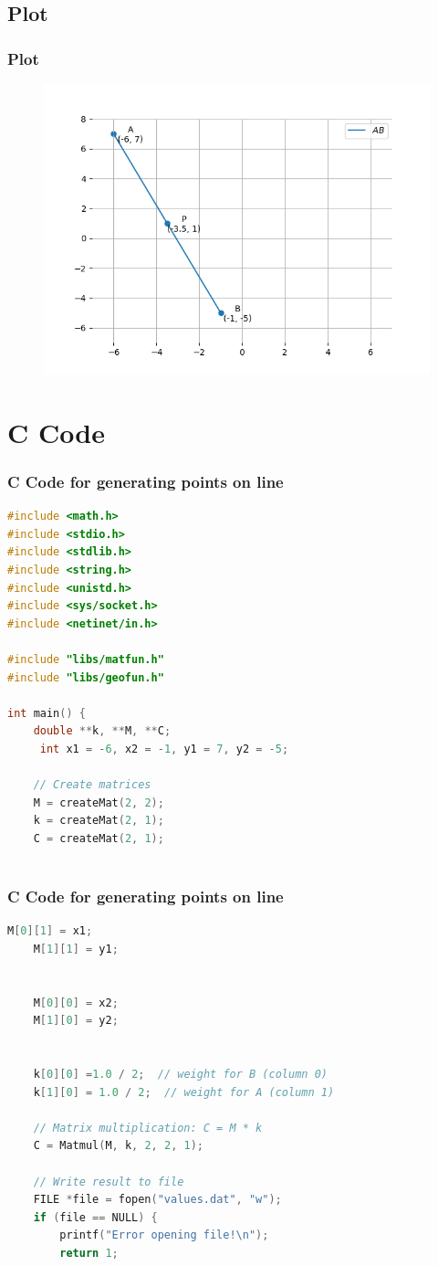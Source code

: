 \documentclass{beamer}
\theoremstyle{remark}
\numberwithin{equation}{section}
\begin{document}
\subsection{Plot}
\begin{frame}[fragile]
\frametitle{Plot}

\begin{figure}[H]
   \centering
   \includegraphics[width=0.8\linewidth]{figs/fig1.png}
	\caption{}
   \label{stemplot}
\end{figure}
\end{frame}

\section{C Code}
\begin{frame}[fragile]
\frametitle{C Code for generating points on line}
\begin{lstlisting}[language=C]
#include <math.h>
#include <stdio.h>
#include <stdlib.h>
#include <string.h>
#include <unistd.h>
#include <sys/socket.h>
#include <netinet/in.h>

#include "libs/matfun.h"
#include "libs/geofun.h"

int main() {
    double **k, **M, **C;
     int x1 = -6, x2 = -1, y1 = 7, y2 = -5;

    // Create matrices
    M = createMat(2, 2);
    k = createMat(2, 1);
    C = createMat(2, 1);
 
    \end{lstlisting}
\end{frame}
\begin{frame}[fragile]
\frametitle{C Code for generating points on line}
\begin{lstlisting}[language=C]
  M[0][1] = x1;  
    M[1][1] = y1;  


    M[0][0] = x2;  
    M[1][0] = y2;  

 
    k[0][0] =1.0 / 2;  // weight for B (column 0)
    k[1][0] = 1.0 / 2;  // weight for A (column 1)

    // Matrix multiplication: C = M * k
    C = Matmul(M, k, 2, 2, 1);

    // Write result to file
    FILE *file = fopen("values.dat", "w");
    if (file == NULL) {
        printf("Error opening file!\n");
        return 1;
\end{lstlisting}
\end{frame}
\end{document}
